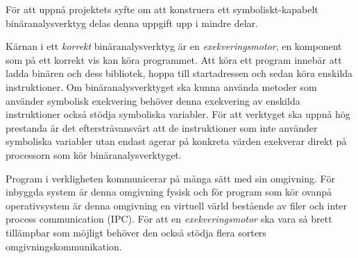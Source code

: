 

För att uppnå projektets syfte om att konstruera ett symboliskt-kapabelt
binäranalysverktyg delas denna uppgift upp i mindre delar.

Kärnan i ett \textit{korrekt} binäranalysverktyg är en
\textit{exekveringsmotor}, en komponent som på ett korrekt vis kan köra
programmet. Att köra ett program innebär att ladda binären och dess bibliotek,
hoppa till startadressen och sedan köra enskilda instruktioner. Om
binäranalysverktyget ska kunna använda metoder som använder symbolisk exekvering
behöver denna exekvering av enskilda instruktioner också stödja symboliska
variabler. För att verktyget ska uppnå hög prestanda är det eftersträvansvärt
att de instruktioner som inte använder symboliska variabler utan endast agerar
på konkreta värden exekverar direkt på processorn som kör binäranalysverktyget.

Program i verkligheten kommunicerar på många sätt med sin omgivning. För
inbyggda system är denna omgivning fysisk och för program som kör ovanpå
operativsystem är denna omgivning en virtuell värld bestående av filer och inter
process communication (IPC). För att en
\textit{exekveringsmotor} ska vara så brett tillämpbar som möjligt behöver den
också stödja flera sorters omgivningskommunikation.

